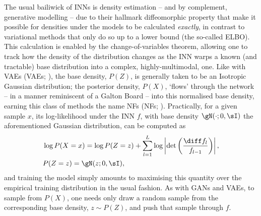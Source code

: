 The usual bailiwick of INNs is density estimation -- and by complement, generative modelling -- due
to their hallmark diffeomorphic property that make it possible for densities under the models to be
calculated \emph{exactly}, in contrast to variational methods that only do so up to a lower bound
(the so-called \ac{ELBO}). 
%
%
This calculation is enabled by the change-of-variables theorem, allowing one to track how the
density of the distribution changes as the INN warps a known (and tractable) base distribution into
a complex, highly-multimodal, one.
%
Like with \aclp{VAE} (\acsp{VAE}; \citealp{kingma2014auto}), the base density, \(P(Z)\), is generally
taken to be an Isotropic Gaussian distribution; the posterior density, \(P(X)\), `flows' through
the network -- in a manner reminiscent of a Galton Board -- into this normalised base density,
earning this class of methods the name \aclp{NF} (\acsp{NF}; \citealp{rezende2015variational,
kobyzev2020normalizing}).
%
Practically, for a given sample \(x\), its log-likelihood under the INN \(f\), with base density
\(\gN(\cdot; 0, \sI)\) the aforementioned Gaussian distribution, can be computed as
%
\begin{equation*}
%
    \begin{aligned}
        &\log P(X=x) = 
        \log P(Z=z) + \sum_{l=1}^L \log \left| \det\left( \frac{\diff f_l}{ f_{l-1}}\right)
        \right|, \\
        &P(Z=z) = \gN(z; 0, \sI),
    \end{aligned}
\label{eq:cov}
%
\end{equation*}
%
and training the model simply amounts to maximising this quantity over the empirical training
distribution in the usual fashion.
%
As with \acp{GAN} and \acp{VAE}, to sample from \(P(X)\), one needs only draw a random sample from
the corresponding base density, \(z \sim P(Z) \), and push that sample through \(f\).



